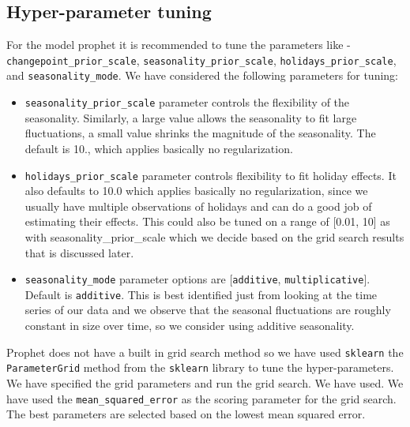 \documentclass[mstat,12pt]{unswthesis}
\begin{document}
\subsection{Hyper-parameter tuning}\label{hyper-parameter-tuning}

For the model prophet it is recommended to tune the parameters like -
\linebreak \texttt{changepoint\_prior\_scale},
\texttt{seasonality\_prior\_scale}, \texttt{holidays\_prior\_scale}, and
\texttt{seasonality\_mode}. We have considered the following parameters
for tuning:

\begin{itemize}
\item
  \texttt{seasonality\_prior\_scale} parameter controls the flexibility
  of the seasonality. Similarly, a large value allows the seasonality to
  fit large fluctuations, a small value shrinks the magnitude of the
  seasonality. The default is 10., which applies basically no
  regularization.
\item
  \texttt{holidays\_prior\_scale} parameter controls flexibility to fit
  holiday effects. It also defaults to 10.0 which applies basically no
  regularization, since we usually have multiple observations of
  holidays and can do a good job of estimating their effects. This could
  also be tuned on a range of {[}0.01, 10{]} as with
  seasonality\_prior\_scale which we decide based on the grid search
  results that is discussed later.
\item
  \texttt{seasonality\_mode} parameter options are
  {[}\texttt{\textquotesingle{}additive\textquotesingle{}},
  \texttt{\textquotesingle{}multiplicative\textquotesingle{}}{]}.
  Default is \texttt{\textquotesingle{}additive\textquotesingle{}}. This
  is best identified just from looking at the time series of our data
  and we observe that the seasonal fluctuations are roughly constant in
  size over time, so we consider using additive seasonality.
\end{itemize}

Prophet does not have a built in grid search method so we have used
\texttt{sklearn} the \texttt{ParameterGrid} method from the
\texttt{sklearn} library to tune the hyper-parameters. We have specified
the grid parameters and run the grid search. We have used. We have used
the \texttt{mean\_squared\_error} as the scoring parameter for the grid
search. The best parameters are selected based on the lowest mean
squared error.
\end{document}
